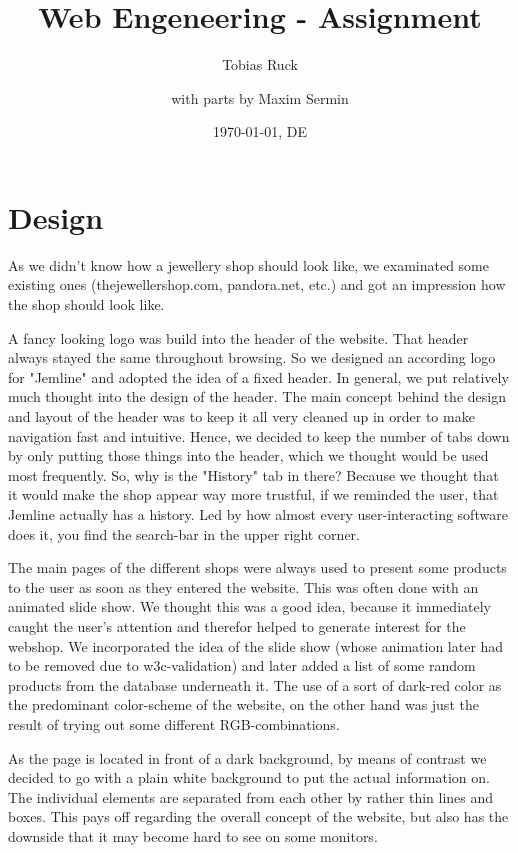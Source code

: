 \documentclass{scrartcl}
\title{Web Engeneering - Assignment}
\author{Tobias Ruck \and with parts by Maxim Sermin}
\date{\today{}, DE}
\begin{document}
\maketitle
\tableofcontents

\section{Design}
As we didn't know how a jewellery shop should look like, we examinated some existing ones (thejewellershop.com, pandora.net, etc.) and 
got an impression how the shop should look like.

A fancy looking logo was build into the header of the website. That header always stayed the same throughout browsing.
So we designed an according logo for "Jemline" and adopted the idea of a fixed header. In general, we put relatively much thought into the design of the header.
The main concept behind the design and layout of the header was to keep it all very cleaned up in order to make navigation fast and intuitive. Hence, we decided to keep the number of tabs down by only putting those things into the header, which we thought would be used most frequently. So, why is the "History" tab in there? Because we thought that it would make the shop appear way more trustful, if we reminded the user, that Jemline actually has a history.
Led by how almost every user-interacting software does it, you find the search-bar in the upper right corner.

The main pages of the different shops were always used to present some products to the user as soon as they entered the website. This was often done with an animated slide show. We thought this was a good idea, because it immediately caught the user's attention and therefor helped to generate interest for the webshop.
We incorporated the idea of the slide show (whose animation later had to be removed due to w3c-validation) and later added a list of some random products from the database underneath it.
The use of a sort of dark-red color as the predominant color-scheme of the website, on the other hand was just the result of trying out some different RGB-combinations.

As the page is located in front of a dark background, by means of contrast we decided to go with a plain white background to put the actual information on.
The individual elements are separated from each other by rather thin lines and boxes. This pays off regarding the overall concept of the website, but also has the downside that it may become hard to see on some monitors.
\end{document}
